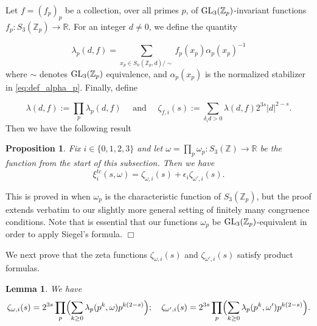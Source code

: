\documentclass{article}
\def\Z{{\mathbb Z}}
\def\GL{{\rm GL}}
\def\R{{\mathbb R}}
\def\Z{{\mathbb Z}}
\newtheorem{lemma}[theorem]{Lemma}
\newtheorem{proposition}[theorem]{Proposition}
\newenvironment{proof}{\noindent {\bf Proof:}}{$\Box$ \vspace{2 ex}}
\begin{document}
Let $f=(f_p)_p$ be a collection, over all primes $p$, of $\GL_3(\Z_p)$-invariant functions $f_p:S_3(\Z_p)\to\R$. For an integer $d\neq 0$, we define the quantity

 $$\lambda_p(d,f)=\sum_{x_p\in S_n(\Z_p,d)/\sim} f_p(x_p)\alpha_p(x_p)^{-1}$$
where $\sim$ denotes $\GL_3(\Z_p)$ equivalence, and $\alpha_p(x_p)$ is the normalized stabilizer in \eqref{eq:def_alpha_p}.
Finally, define 

$$\lambda(d,f):=\prod_p \lambda_p(d,f)\quad \mbox{  and  } \quad\zeta_{f,i}(s):=\sum_{\delta_i d>0} \lambda(d,f)2^{3s} |d|^{2-s}.$$
Then we have the following result

 \begin{proposition}\label{prop:symsumformula}
 Fix $i\in\{0,1,2,3\}$ and let $\omega=\prod_p\omega_p:S_3(\Z)\to\R$ be the function from the start of this subsection. Then we have
 $$\xi^{tc}_{i}(s,\omega)=\zeta_{\omega,i}(s)+\epsilon_i \zeta_{\omega',i}(s).$$
 \end{proposition}

\begin{proof}
    This is proved in \cite[prop 2.2]{ibukiyamasaitoI} when $\omega_p$ is the characteristic function of $S_3(\Z_p)$, but the proof extends verbatim to our slightly more general setting of finitely many congruence conditions. Note that is essential that our functions $\omega_p$ be $\GL_3(\Z_p)$-equivalent in order to apply Siegel's formula.
\end{proof}

We next prove that the zeta functions $\zeta_{\omega,i}(s)$ and $\zeta_{\omega',i}(s)$ satisfy product formulas.

\begin{lemma}\label{lem:prodformulasym}
We have
\begin{equation*}
\zeta_{\omega,i}(s)=2^{3s}\prod_p\Bigl(\sum_{k\geq 0}
\lambda_p(p^k,\omega)p^{k(2-s)}
\Bigr);\quad
\zeta_{\omega',i}(s)=2^{3s}\prod_p\Bigl(\sum_{k\geq 0}
\lambda_p(p^k,\omega')p^{k(2-s)}
\Bigr).
\end{equation*}
\end{lemma}
\end{document}
